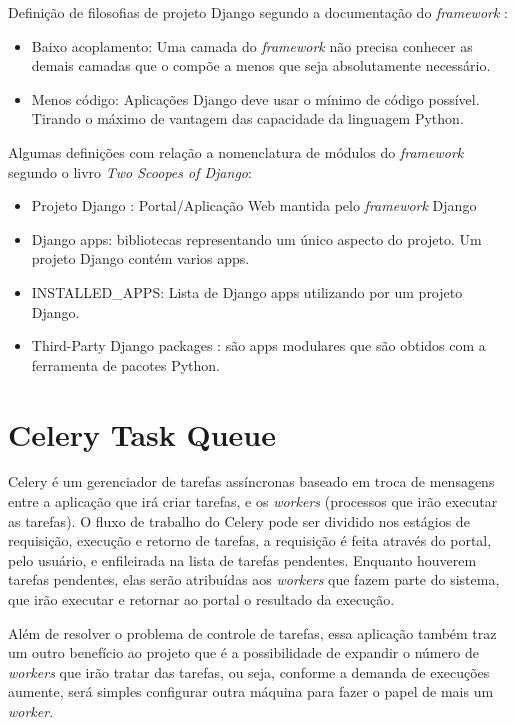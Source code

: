 \documentclass[tg]{mdtufsm}
\begin{document}
Definição de filosofias de projeto Django segundo a documentação do \emph{framework} \cite{Django}:
\begin{itemize}
	\item Baixo acoplamento: Uma camada do \emph{framework} não precisa conhecer as demais camadas que o compõe a menos que seja absolutamente necessário. 
	\item Menos código: Aplicações Django deve usar o mínimo de código possível. Tirando o máximo de vantagem das capacidade da linguagem Python.
\end{itemize}

Algumas definições com relação a nomenclatura de módulos do \emph{framework} segundo o livro \textit{Two Scoopes of Django}\cite{twoscoopes}:
\begin{itemize}
	\item Projeto Django : Portal/Aplicação Web mantida pelo \emph{framework} Django
	\item Django apps: bibliotecas representando um único aspecto do projeto. Um projeto Django contém varios apps.
	\item INSTALLED\_APPS: Lista de Django apps utilizando por um projeto Django.
	\item Third-Party Django packages : são apps modulares que são obtidos com a ferramenta de pacotes Python.
\end{itemize}

\section{Celery Task Queue}
Celery é um gerenciador de tarefas assíncronas baseado em troca de mensagens entre a aplicação que irá criar tarefas, e os \emph{workers} (processos que irão executar as tarefas). O fluxo de trabalho do Celery pode ser dividido nos estágios de requisição, execução e retorno de tarefas, a requisição é feita através do portal, pelo usuário, e enfileirada na lista de tarefas pendentes. Enquanto houverem tarefas pendentes, elas serão atribuídas aos \emph{workers} que fazem parte do sistema, que irão executar e retornar ao portal o resultado da execução.

Além de resolver o problema de controle de tarefas, essa aplicação também traz um outro benefício ao projeto que é a possibilidade de expandir o número de \emph{workers} que irão tratar das tarefas, ou seja, conforme a demanda de execuções aumente, será simples configurar outra máquina para fazer o papel de mais um \emph{worker}.
\end{document}
